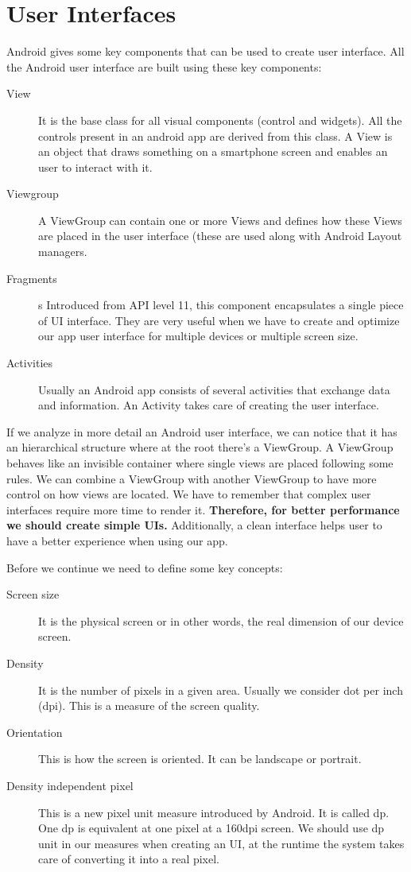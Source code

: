 \chapter{User Interfaces}
Android gives some key components that can be used to create user interface. All the Android user interface are built using these key components:

\begin{description}
	\item[View] It is the base class for all visual components (control and widgets). All the controls present in an android app are derived
	from this class. A View is an object that draws something on a smartphone screen and enables an user to interact with it.
	\item[Viewgroup] A ViewGroup can contain one or more Views and defines how these Views are placed in the user interface
	(these are used along with Android Layout managers.
	\item[Fragments] s Introduced from API level 11, this component encapsulates a single piece of UI interface. They are very useful
	when we have to create and optimize our app user interface for multiple devices or multiple screen size.
	\item[Activities] Usually an Android app consists of several activities that exchange data and information. An Activity takes
	care of creating the user interface.
\end{description}

If we analyze in more detail an Android user interface, we can notice that it has an hierarchical structure where at the root there’s
a ViewGroup. A ViewGroup behaves like an invisible container where single views are placed following some rules. We
can combine a ViewGroup with another ViewGroup to have more control on how views are located. We have to remember that complex user interfaces require more time to render it. \textbf{Therefore, for better performance we should create
simple UIs.} Additionally, a clean interface helps user to have a better experience when using our app.

Before we continue we need to define some key concepts:

\begin{description}
	\item[Screen size] It is the physical screen or in other words, the real dimension of our device screen.
	\item[Density] It is the number of pixels in a given area. Usually we consider dot per inch (dpi). This is a measure of the screen
	quality.
	\item[Orientation] This is how the screen is oriented. It can be landscape or portrait.
	\item[Density independent pixel] This is a new pixel unit measure introduced by Android. It is called dp. One dp is equivalent at
	one pixel at a 160dpi screen. We should use dp unit in our measures when creating an UI, at the runtime the system takes care of
	converting it into a real pixel.
\end{description}

